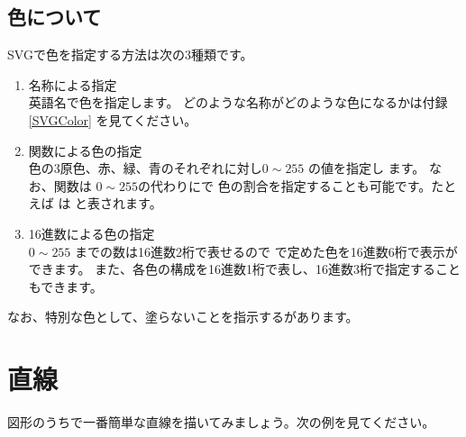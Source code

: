 \subsection{色について}\label{howtoindicatecolor}
SVGで色を指定する方法は次の3種類です。
\begin{enumerate}
 \item 名称による指定\\英語名で色を指定します。
 どのような名称がどのような色になるかは付録\ref{SVGColor}%
を見てください。
 \item {}関数による色の指定\\
色の3原色、赤、緑、青のそれぞれに対し$0\sim255$ の値を指定し
       ます。%
%
なお、関数は $0\sim255$の代わりに\Showattrib{\%}で
       色の割合を指定することも可能です。たとえば  は
        と表されます。
 \item 16進数による色の指定\\
$0\sim255$ までの数は16進数2桁で表せるので
       で定めた色を16進数6桁で表示ができます。
また、各色の構成を16進数1桁で表し、16進数3桁で指定することもできます。
\end{enumerate}
なお、特別な色として、塗らないことを指示するがあります。
\section{直線}
図形のうちで一番簡単な直線を描いてみましょう。次の例を見てください。

